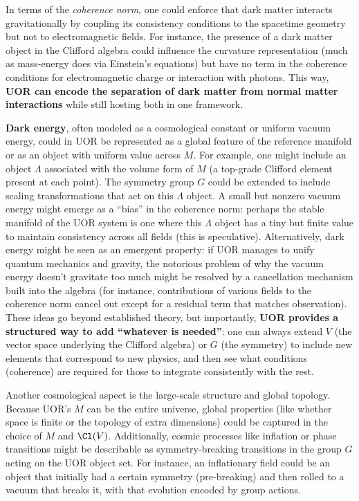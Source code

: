 \documentclass[12pt]{article}
\begin{document}
\medskip

In terms of the \emph{coherence norm}, one could enforce that dark matter interacts gravitationally by coupling its consistency conditions to the spacetime geometry but not to electromagnetic fields. For instance, the presence of a dark matter object in the Clifford algebra could influence the curvature representation (much as mass-energy does via Einstein’s equations) but have no term in the coherence conditions for electromagnetic charge or interaction with photons. This way, \textbf{UOR can encode the separation of dark matter from normal matter interactions} while still hosting both in one framework.

\medskip

\textbf{Dark energy}, often modeled as a cosmological constant or uniform vacuum energy, could in UOR be represented as a global feature of the reference manifold or as an object with uniform value across $M$. For example, one might include an object $\Lambda$ associated with the volume form of $M$ (a top-grade Clifford element present at each point). The symmetry group $G$ could be extended to include scaling transformations that act on this $\Lambda$ object. A small but nonzero vacuum energy might emerge as a “bias” in the coherence norm: perhaps the stable manifold of the UOR system is one where this $\Lambda$ object has a tiny but finite value to maintain consistency across all fields (this is speculative). Alternatively, dark energy might be seen as an emergent property: if UOR manages to unify quantum mechanics and gravity, the notorious problem of why the vacuum energy doesn’t gravitate too much might be resolved by a cancellation mechanism built into the algebra (for instance, contributions of various fields to the coherence norm cancel out except for a residual term that matches observation). These ideas go beyond established theory, but importantly, \textbf{UOR provides a structured way to add ``whatever is needed''}: one can always extend $V$ (the vector space underlying the Clifford algebra) or $G$ (the symmetry) to include new elements that correspond to new physics, and then see what conditions (coherence) are required for those to integrate consistently with the rest.

\medskip

Another cosmological aspect is the large-scale structure and global topology. Because UOR’s $M$ can be the entire universe, global properties (like whether space is finite or the topology of extra dimensions) could be captured in the choice of $M$ and $\Cl(V)$. Additionally, cosmic processes like inflation or phase transitions might be describable as symmetry-breaking transitions in the group $G$ acting on the UOR object set. For instance, an inflationary field could be an object that initially had a certain symmetry (pre-breaking) and then rolled to a vacuum that breaks it, with that evolution encoded by group actions.
\end{document}
